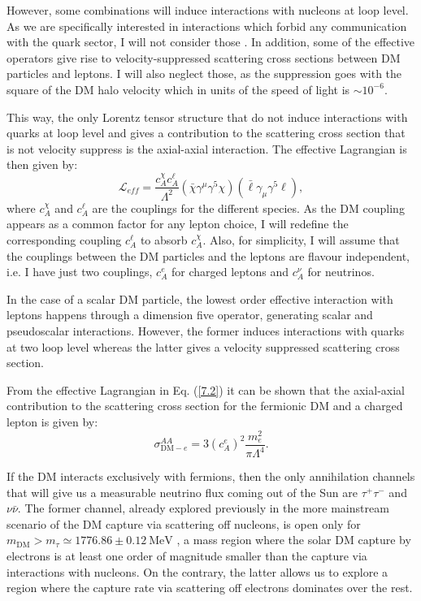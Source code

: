 However, some combinations will induce interactions with nucleons at loop level. As we are specifically interested in interactions which forbid any communication with the quark sector, I will not consider those \cite{Kopp2009}. In addition, some of the effective operators give rise to velocity-suppressed scattering cross sections between DM particles and leptons. I will also neglect those, as the suppression goes with the square of the DM halo velocity which in units of the speed of light is $\sim 10^{-6}$.

This way, the only Lorentz tensor structure that do not induce interactions with quarks at loop level and gives a contribution to the scattering cross section that is not velocity suppress is the axial-axial interaction. The effective Lagrangian is then given by:
\begin{equation}\label{7.2}
	\mathcal{L}_{eff} = \frac{c_{A}^{\chi} c_{A}^{\ell}}{\Lambda^{2}} \left(\bar{\chi} \gamma^{\mu}\gamma^{5} \chi\right)\left(\bar{\ell} \gamma_{\mu}\gamma^{5} \ell\right),
\end{equation}
where $c_{A}^{\chi}$ and $c_{A}^{\ell}$ are the couplings for the different species. As the DM coupling appears as a common factor for any lepton choice, I will redefine the corresponding coupling $c_{A}^{\ell}$ to absorb $c_{A}^{\chi}$. Also, for simplicity, I will assume that the couplings between the DM particles and the leptons are flavour independent, i.e. I have just two couplings, $c_{A}^{e}$ for charged leptons and $c_{A}^{\nu}$ for neutrinos.

In the case of a scalar DM particle, the lowest order effective interaction with leptons happens through a dimension five operator, generating scalar and pseudoscalar interactions. However, the former induces interactions with quarks at two loop level whereas the latter gives a velocity suppressed scattering cross section.

From the effective Lagrangian in Eq. (\ref{7.2}) it can be shown that the axial-axial contribution to the scattering cross section for the fermionic DM and a charged lepton is given by:
\begin{equation}\label{7.3}
	\sigma_{\mathrm{DM}-e}^{AA} = 3 \left(c_{A}^{e}\right)^{2} \frac{m_{e}^{2}}{\pi \Lambda^{4}}.
\end{equation}

If the DM interacts exclusively with fermions, then the only annihilation channels that will give us a measurable neutrino flux coming out of the Sun are $\tau^{+}\tau^{-}$ and $\nu\bar{\nu}$. The former channel, already explored previously in the more mainstream scenario of the DM capture via scattering off nucleons, is open only for $m_{\mathrm{DM}} > m_{\tau} \simeq 1776.86 \pm 0.12 \ \mathrm{MeV}$ \cite{ParticleDataGroup2020}, a mass region where the solar DM capture by electrons is at least one order of magnitude smaller than the capture via interactions with nucleons. On the contrary, the latter allows us to explore a region where the capture rate via scattering off electrons dominates over the rest.

